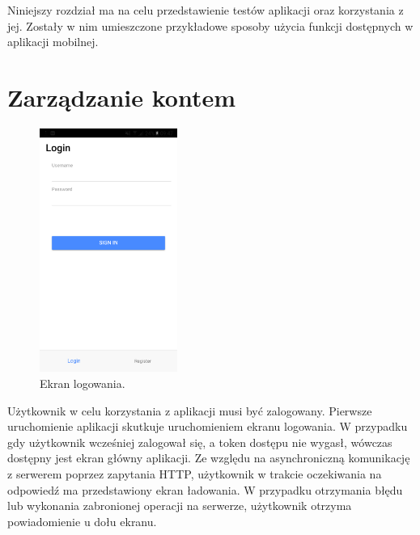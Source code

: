 
Niniejszy rozdział ma na celu przedstawienie testów aplikacji oraz korzystania z jej. Zostały w nim umieszczone przykładowe sposoby użycia funkcji dostępnych w aplikacji mobilnej.



\section{Zarządzanie kontem}{

\begin{figure}
	\centering
	\includegraphics[width=0.4\textwidth]{images/login_page}
	\caption{Ekran logowania.}
\end{figure}

Użytkownik w celu korzystania z aplikacji musi być zalogowany. Pierwsze uruchomienie aplikacji skutkuje uruchomieniem ekranu logowania. W przypadku gdy użytkownik wcześniej zalogował się, a token dostępu nie wygasł, wówczas dostępny jest ekran główny aplikacji. Ze względu na asynchroniczną komunikację z serwerem poprzez zapytania HTTP, użytkownik w trakcie oczekiwania na odpowiedź ma przedstawiony ekran ładowania. W przypadku otrzymania błędu lub wykonania zabronionej operacji na serwerze, użytkownik otrzyma powiadomienie u dołu ekranu.
\newpage


}
